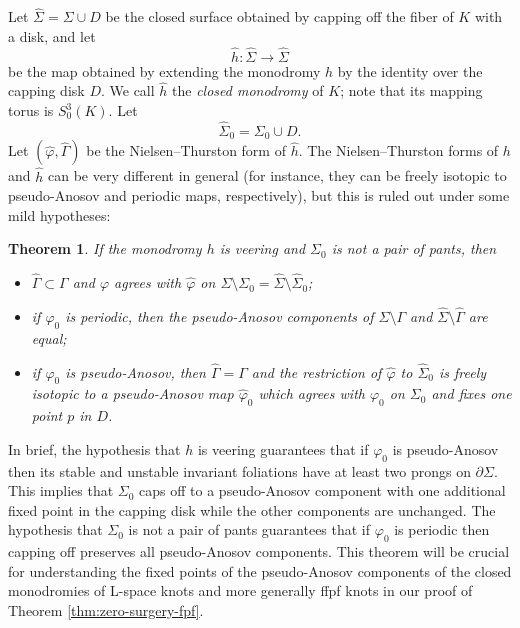 \documentclass[11pt]{amsart}
\newtheorem {theorem}{Theorem}
\numberwithin{equation}{section}
\numberwithin{theorem}{section}
\theoremstyle{definition}
\begin{document}
Let $\hat\Sigma = \Sigma\cup D$ be the closed surface obtained by capping off the fiber of $K$ with a disk, and let \[\hat h:\hat\Sigma\to\hat\Sigma\] be the map obtained by extending the monodromy $h$ by the identity over the capping disk $D$. We call $\hat h$  the \emph{closed monodromy} of $K$; note that its mapping torus  is $S^3_0(K)$. Let \[\hat\Sigma_0 = \Sigma_0 \cup D.\] Let $(\hat\varphi,\hat\Gamma)$ be the  Nielsen--Thurston form of $\hat h$. The Nielsen--Thurston forms of $h$ and  $\hat h$ can be very different in general (for instance, they can be freely isotopic to pseudo-Anosov and periodic maps, respectively), but this is ruled out under some mild hypotheses: 

\begin{theorem} \label{thm:rv-fill-monodromy}
If the monodromy $h$ is veering and $\Sigma_0$ is not a pair of pants, then
\begin{itemize}
\item $\hat\Gamma\subset \Gamma$ and $\varphi$ agrees with $\hat\varphi$ on $\Sigma\setminus \Sigma_0 = \hat\Sigma\setminus\hat\Sigma_0$;\vspace{1mm}
\item if $\varphi_0$ is periodic, then the pseudo-Anosov components of $\Sigma\setminus\Gamma$ and $\hat\Sigma\setminus\hat{\Gamma}$ are equal; \vspace{1mm}
\item if $\varphi_0$ is pseudo-Anosov, then $\hat\Gamma= \Gamma$ and the restriction of $\hat\varphi$ to $\hat\Sigma_0$ is freely isotopic to a pseudo-Anosov map  $\hat\varphi_0$ which agrees with   $\varphi_0$ on $\Sigma_0$ and fixes one point $p$ in $D$.
\end{itemize}
\end{theorem}

In brief, the hypothesis that $h$ is veering guarantees that if $\varphi_0$ is pseudo-Anosov then its stable and unstable invariant foliations have at least two prongs on $\partial \Sigma$. This implies that  $\Sigma_0$ caps off to a pseudo-Anosov component with one additional fixed point in the capping disk while the other components are unchanged. The hypothesis  that $\Sigma_0$ is not a pair of pants guarantees that if $\varphi_0$ is periodic then capping off preserves all pseudo-Anosov components. This theorem will be crucial for understanding  the fixed points of the pseudo-Anosov components of the closed monodromies of L-space knots and more generally ffpf knots in our proof of Theorem \ref{thm:zero-surgery-fpf}.
\end{document}
